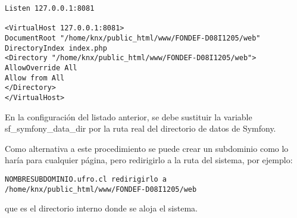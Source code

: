 \lstset{language=sh}
\begin{lstlisting}
Listen 127.0.0.1:8081

<VirtualHost 127.0.0.1:8081>
DocumentRoot "/home/knx/public_html/www/FONDEF-D08I1205/web"
DirectoryIndex index.php
<Directory "/home/knx/public_html/www/FONDEF-D08I1205/web">
AllowOverride All
Allow from All
</Directory>
</VirtualHost>
\end{lstlisting}


En la configuración del listado anterior, se debe sustituir la variable sf\_symfony\_data\_dir por la ruta real del directorio de datos de Symfony.\newline

Como alternativa a este procedimiento se puede crear un subdominio como lo har\'ia para cualquier p\'agina, pero redirigirlo a la ruta del sistema, por ejemplo:
\lstset{language=sh}
\begin{lstlisting}
NOMBRESUBDOMINIO.ufro.cl redirigirlo a /home/knx/public_html/www/FONDEF-D08I1205/web
\end{lstlisting}


que es el directorio interno donde se aloja el sistema.
